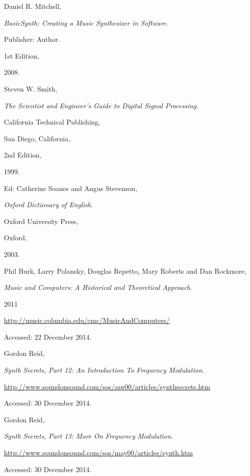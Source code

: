 \documentclass[12pt,twoside]{report}
\begin{document}
\begin{thebibliography}{99}


Daniel R. Mitchell,

\emph{BasicSynth: Creating a Music Synthesizer in Software}.

Publisher: Author.

1st Edition,

2008.


Steven W. Smith,

\emph{The Scientist and Engineer's Guide to Digital Signal Processing}.

California Technical Publishing,

San Diego, California,

2nd Edition,

1999.


Ed: Catherine Soanes and Angus Stevenson,

\emph{Oxford Dictionary of English}.

Oxford University Press,

Oxford,

2003.


Phil Burk, Larry Polansky, Douglas Repetto, Mary Roberts and Dan Rockmore,

\emph{Music and Computers: A Historical and Theoretical Approach}.

2011

\url{http://music.columbia.edu/cmc/MusicAndComputers/}

Accessed: 22 December 2014.


Gordon Reid,

\emph{Synth Secrets, Part 12: An Introduction To Frequency Modulation}.

\url{http://www.soundonsound.com/sos/apr00/articles/synthsecrets.htm}

Accessed: 30 December 2014.


Gordon Reid,

\emph{Synth Secrets, Part 13: More On Frequency Modulation}.

\url{http://www.soundonsound.com/sos/may00/articles/synth.htm}

Accessed: 30 December 2014.


\end{thebibliography}
\end{document}
